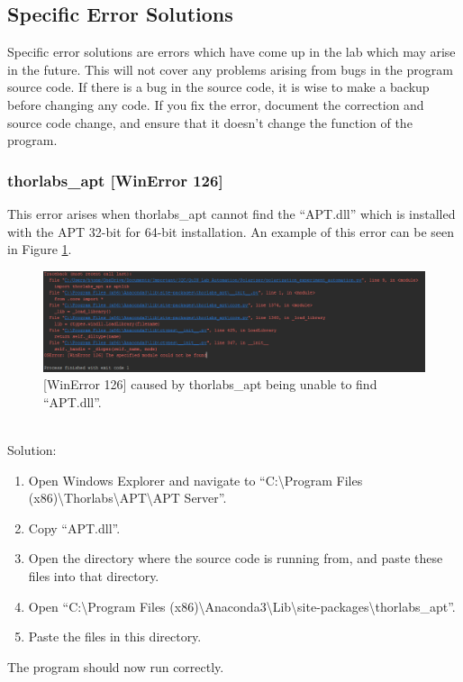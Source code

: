 \documentclass[11pt, letterpaper, titlepage]{article}
\begin{document}
\subsection{Specific Error Solutions} %
Specific error solutions are errors which have come up in the lab which may arise in the future.
This will not cover any problems arising from bugs in the program source code.
If there is a bug in the source code, it is wise to make a backup before changing any code.
If you fix the error, document the correction and source code change, and ensure that it doesn't change the function of the program.
\subsubsection{thorlabs\_apt [WinError 126]} %
This error arises when thorlabs\_apt cannot find the ``APT.dll'' which is installed with the APT 32-bit for 64-bit installation.
An example of this error can be seen in Figure \ref{fig:missing_aptdll}.
\begin{figure}[h]
    \begin{center}
    \includegraphics[scale=.60]{missing_aptdll.png}
    \caption{[WinError 126] caused by thorlabs\_apt being unable to find ``APT.dll''.}
    \label{fig:missing_aptdll}
    \end{center}
\end{figure}
\\Solution:
\begin{enumerate}
    \item Open Windows Explorer and navigate to ``C:\textbackslash Program Files (x86)\textbackslash Thorlabs\textbackslash APT\textbackslash APT Server''.
    \item Copy ``APT.dll''.
    \item Open the directory where the source code is running from, and paste these files into that directory.
    \item Open ``C:\textbackslash Program Files (x86)\textbackslash Anaconda3\textbackslash Lib\textbackslash site-packages\textbackslash thorlabs\_apt''.
    \item Paste the files in this directory.
\end{enumerate}
The program should now run correctly.
\newpage
\end{document}

